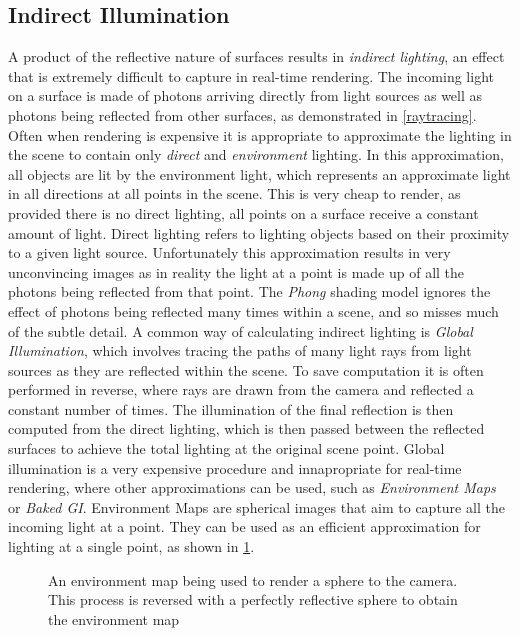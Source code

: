 \documentclass[ %
                    author={Gavin Parker},
                supervisor={Dr. Neill Campbell},
                    degree={MEng},
                     title={Deep Siamese Networks for Illumination Estimation from Stereo Images},
                  subtitle={},
                      type={Research},
                      year={2018} ]{dissertation}
\begin{document}
\subsection{Indirect Illumination}
A product of the reflective nature of surfaces results in \textit{indirect lighting}, an effect that is extremely difficult to capture in real-time rendering. The incoming light on a surface is made of photons arriving directly from light sources as well as photons being reflected from other surfaces, as demonstrated in \ref{raytracing}. Often when rendering is expensive it is appropriate to approximate the lighting in the scene to contain only \textit{direct} and \textit{environment} lighting. In this approximation, all objects are lit by the environment light, which represents an approximate light in all directions at all points in the scene. This is very cheap to render, as provided there is no direct lighting, all points on a surface receive a constant amount of light. Direct lighting refers to lighting objects based on their proximity to a given light source. Unfortunately this approximation results in very unconvincing images as in reality the light at a point is made up of all the photons being reflected from that point. The \textit{Phong} shading model ignores the effect of photons being reflected many times within a scene, and so misses much of the subtle detail. A common way of calculating indirect lighting is \textit{Global Illumination}, which involves tracing the paths of many light rays from light sources as they are reflected within the scene. To save computation it is often performed in reverse, where rays are drawn from the camera and reflected a constant number of times. The illumination of the final reflection is then computed from the direct lighting, which is then passed between the reflected surfaces to achieve the total lighting at the original scene point. Global illumination is a very expensive procedure and innapropriate for real-time rendering, where other approximations can be used, such as \textit{Environment Maps} or \textit{Baked GI}. Environment Maps are spherical images that aim to capture all the incoming light at a point. They can be used as an efficient approximation for lighting at a single point, as shown in \ref{environment map}.
\begin{center}
\begin{figure}[H]
\centering
{}
\label{environment map}
\caption{An environment map being used to render a sphere to the camera. This process is reversed with a perfectly reflective sphere to obtain the environment map}
\end{figure}
\end{center}
\end{document}

